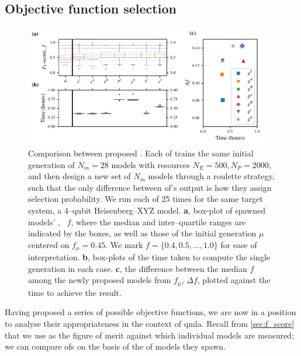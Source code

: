\subsection{Objective function selection}\label{sec:obj_fnc_selection}
\begin{figure}
    \centering
    \includegraphics[width=0.95\textwidth]{theoretical_study/figures/objective_fnc_comparison.pdf}
    \caption[Comparison between proposed objective functions]{
        Comparison between proposed . 
        Each \gls{of} trains the same initial generation of $N_m=28$ models with resources
        $N_E=500, N_P=2000$, and then design a new set of $N_m$ models through 
        a roulette strategy, such that the only difference between \gls{of}'s output 
        is how they assign selection probability.
        We run each \gls{of} 25 times for the same target system, 
            a $4$--qubit Heisenberg--XYZ model. 
        \textbf{a}, box-plot of spawned models' \fs, \ $f$, 
            where the median and inter--quartile ranges are indicated by the boxes,
            as well as those of the initial generation $\mu$ centered on $f_{\mu}=0.45$.
            We mark $f=\{0.4, 0.5, ..., 1.0\}$ for ease of interpretation. 
        \textbf{b}, box-plots of the time taken to compute the single generation in each case.
        \textbf{c}, the difference between the median $f$ among the 
            newly proposed models from $f_{\mu}$, $\Delta f$,
            plotted against the time to achieve the result. 
    }
    \label{fig:obj_fnc_comparison}
\end{figure}

Having proposed a series of possible objective functions, 
    we are now in a position to analyse their appropriateness in the context of \gls{qmla}. 
Recall from \cref{sec:f_score} that we use \fs as the figure of merit against which individual models are measured;
    we can compare \glspl{of} on the basis of the \fs of models they spawn.

